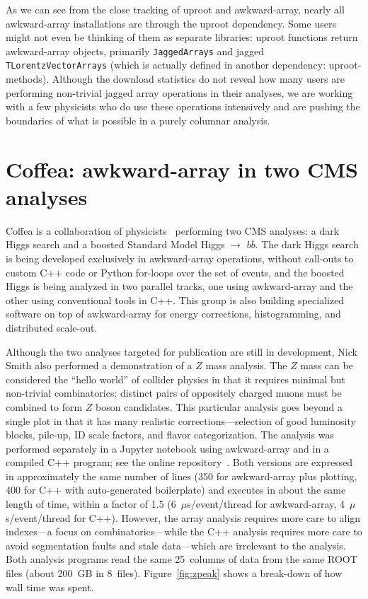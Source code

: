 \documentclass[a4paper]{jpconf}
\begin{document}
As we can see from the close tracking of uproot and awkward-array, nearly all awkward-array installations are through the uproot dependency. Some users might not even be thinking of them as separate libraries: uproot functions return awkward-array objects, primarily {\tt JaggedArrays} and jagged {\tt TLorentzVectorArrays} (which is actually defined in another dependency: uproot-methods). Although the download statistics do not reveal how many users are performing non-trivial jagged array operations in their analyses, we are working with a few physicists who do use these operations intensively and are pushing the boundaries of what is possible in a purely columnar analysis.

\section{Coffea: awkward-array in two CMS analyses}

Coffea is a collaboration of physicists~\cite{coffea} performing two CMS analyses: a dark Higgs search and a boosted Standard Model Higgs $\to$ $b\bar{b}$. The dark Higgs search is being developed exclusively in awkward-array operations, without call-outs to custom C++ code or Python for-loops over the set of events, and the boosted Higgs is being analyzed in two parallel tracks, one using awkward-array and the other using conventional tools in C++. This group is also building specialized software on top of awkward-array for energy corrections, histogramming, and distributed scale-out.

Although the two analyses targeted for publication are still in development, Nick Smith also performed a demonstration of a $Z$ mass analysis. The $Z$ mass can be considered the ``hello world'' of collider physics in that it requires minimal but non-trivial combinatorics: distinct pairs of oppositely charged muons must be combined to form $Z$ boson candidates. This particular analysis goes beyond a single plot in that it has many realistic corrections---selection of good luminosity blocks, pile-up, ID scale factors, and flavor categorization. The analysis was performed separately in a Jupyter notebook using awkward-array and in a compiled C++ program; see the online repository~\cite{zpeak}. Both versions are expressed in approximately the same number of lines (350 for awkward-array plus plotting, 400 for C++ with auto-generated boilerplate) and executes in about the same length of time, within a factor of 1.5 (6~$\mu$s/event/thread for awkward-array, 4~$\mu$s/event/thread for C++). However, the array analysis requires more care to align indexes---a focus on combinatorics---while the C++ analysis requires more care to avoid segmentation faults and stale data---which are irrelevant to the analysis. Both analysis programs read the same 25~columns of data from the same ROOT files (about 200~GB in 8~files). Figure~\ref{fig:zpeak} shows a break-down of how wall time was spent.
\end{document}
